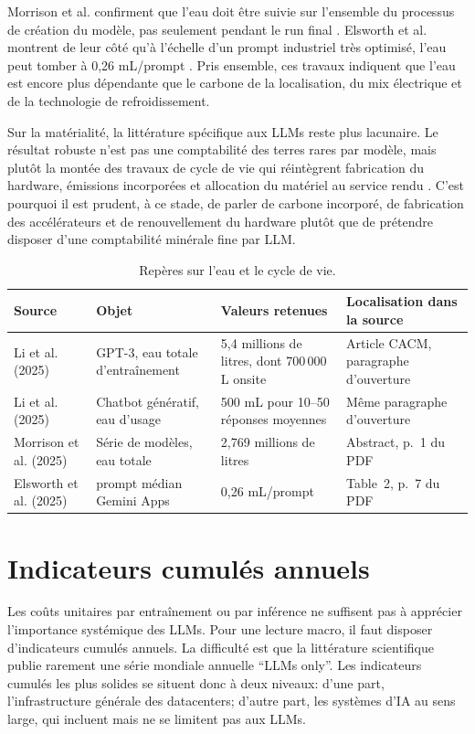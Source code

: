 \documentclass[11pt,a4paper]{article}
\begin{document}
Morrison et al. confirment que l'eau doit être suivie sur l'ensemble du processus de création du modèle, pas seulement pendant le run final \cite{morrison2025}. Elsworth et al. montrent de leur côté qu'à l'échelle d'un prompt industriel très optimisé, l'eau peut tomber à 0,26 mL/prompt \cite{elsworth2025}. Pris ensemble, ces travaux indiquent que l'eau est encore plus dépendante que le carbone de la localisation, du mix électrique et de la technologie de refroidissement.

Sur la matérialité, la littérature spécifique aux LLMs reste plus lacunaire. Le résultat robuste n'est pas une comptabilité des terres rares par modèle, mais plutôt la montée des travaux de cycle de vie qui réintègrent fabrication du hardware, émissions incorporées et allocation du matériel au service rendu \cite{morrison2025}. C'est pourquoi il est prudent, à ce stade, de parler de carbone incorporé, de fabrication des accélérateurs et de renouvellement du hardware plutôt que de prétendre disposer d'une comptabilité minérale fine par LLM.

\begin{table}[htbp]
\centering
\begin{tabularx}{\textwidth}{|L{3.3cm}|L{2.3cm}|L{2.7cm}|Y|}
\hline
Source & Objet & Valeurs retenues & Localisation dans la source \\
\hline
Li et al. (2025) \cite{li2025water} & GPT-3, eau totale d'entraînement & 5,4 millions de litres, dont 700\,000 L onsite & Article CACM, paragraphe d'ouverture \\
\hline
Li et al. (2025) \cite{li2025water} & Chatbot génératif, eau d'usage & 500 mL pour 10--50 réponses moyennes & Même paragraphe d'ouverture \\
\hline
Morrison et al. (2025) \cite{morrison2025} & Série de modèles, eau totale & 2,769 millions de litres & Abstract, p.~1 du PDF \\
\hline
Elsworth et al. (2025) \cite{elsworth2025} & prompt médian Gemini Apps & 0,26 mL/prompt & Table~2, p.~7 du PDF \\
\hline
\end{tabularx}
\caption{Repères sur l'eau et le cycle de vie.}
\label{tab:water}
\end{table}

\section{Indicateurs cumulés annuels}
Les coûts unitaires par entraînement ou par inférence ne suffisent pas à apprécier l'importance systémique des LLMs. Pour une lecture macro, il faut disposer d'indicateurs cumulés annuels. La difficulté est que la littérature scientifique publie rarement une série mondiale annuelle ``LLMs only''. Les indicateurs cumulés les plus solides se situent donc à deux niveaux: d'une part, l'infrastructure générale des datacenters; d'autre part, les systèmes d'IA au sens large, qui incluent mais ne se limitent pas aux LLMs.
\end{document}

